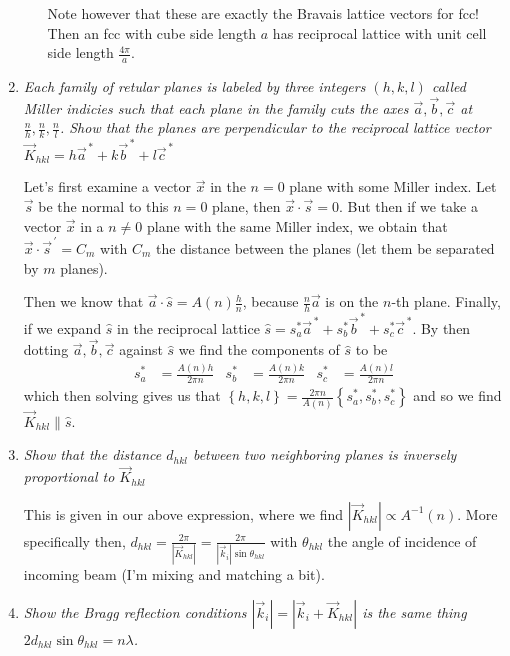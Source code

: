 \documentclass[10pt]{report}
\newcommand{\abs}[1]{\left|#1\right|}
\newcommand{\pvec}[1]{\vec{#1}^{\,\prime}}
\begin{document}
\begin{enumerate}[1.]
\begin{enumerate}[a)]
                Note however that these are exactly the Bravais lattice vectors for fcc! Then an fcc with cube side length $a$ has reciprocal lattice with unit cell side length $\frac{4\pi}{a}$. 
        \end{enumerate}

    \item \emph{Each family of retular planes is labeled by three integers $(h,k,l)$ called Miller indicies such that each plane in the family cuts the axes $\vec{a}, \vec{b}, \vec{c}$ at $\frac{n}{h}, \frac{n}{k}, \frac{n}{l}$. Show that the planes are perpendicular to the reciprocal lattice vector $\vec{K}_{hkl} = h\vec{a}^{\,*} + k\vec{b}^{\,*} + l\vec{c}^{\,*}$}

        Let's first examine a vector $\vec{x}$ in the $n=0$ plane with some Miller index. Let $\vec{s}$ be the normal to this $n=0$ plane, then $\vec{x} \cdot \vec{s} = 0$. But then if we take a vector $\vec{x}$ in a $n\neq0$ plane with the same Miller index, we obtain that $\vec{x} \cdot \pvec{s}= C_m$ with $C_m$ the distance between the planes (let them be separated by $m$ planes). 

        Then we know that $\vec{a} \cdot \hat{s} = A(n)\frac{h}{n}$, because $\frac{n}{h}\vec{a}$ is on the $n$-th plane. Finally, if we expand $\hat{s}$ in the reciprocal lattice $\hat{s} = s_a^*\vec{a}^{\,*} + s_b^*\vec{b}^{\,*} + s_c^*\vec{c}^{\,*}$. By then dotting $\vec{a}, \vec{b}, \vec{c}$ against $\hat{s}$ we find the components of $\hat{s}$ to be
        \begin{align}
            s_a^* &= \frac{A(n)h}{2\pi n}&
            s_b^* &= \frac{A(n)k}{2\pi n}&
            s_c^* &= \frac{A(n)l}{2\pi n}
        \end{align}
        which then solving gives us that $\left\{ h,k,l \right\} = \frac{2\pi n}{A(n)}\left\{ s_a^*, s_b^*, s_c^* \right\}$ and so we find $\vec{K}_{hkl} \parallel \hat{s}$. 
    \item \emph{Show that the distance $d_{hkl}$ between two neighboring planes is inversely proportional to $\vec{K}_{hkl}$}

        This is given in our above expression, where we find $\abs{\vec{K}_{hkl}} \propto A^{-1}(n)$. More specifically then, $d_{hkl} = \frac{2\pi}{\abs{\vec{K}_{hkl}}} = \frac{2\pi}{\abs{\vec{k}_i}\sin\theta_{hkl}}$ with $\theta_{hkl}$ the angle of incidence of incoming beam (I'm mixing and matching a bit).
    \item \emph{Show the Bragg reflection conditions $\abs{\vec{k}_i} = \abs{\vec{k}_i + \vec{K}_{hkl}}$ is the same thing $2d_{hkl} \sin \theta_{hkl} = n\lambda$.}


\end{enumerate}
\end{document}
